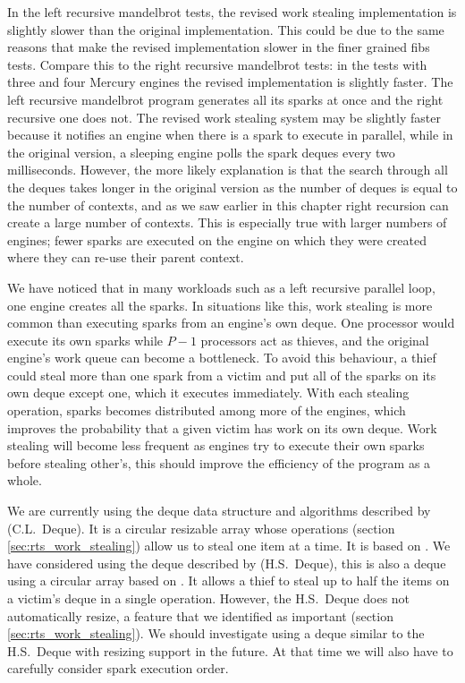 In the left recursive mandelbrot tests,
the revised work stealing implementation is slightly slower than the
original implementation.
This could be due to the same reasons that make the revised implementation
slower in the finer grained fibs tests.
Compare this to the right recursive mandelbrot tests:
in the tests with three and four Mercury engines the revised implementation
is slightly faster.
The left recursive mandelbrot program generates all its
sparks at once and the right recursive one does not.
The revised work stealing system may be slightly faster because it
notifies an engine when there is a spark to execute in parallel,
while in the original version, a sleeping engine polls the spark deques
every two milliseconds.
However, the more likely explanation is that the search through all the
deques takes longer in the original version as the number of deques is equal
to the number of contexts,
and as we saw earlier in this chapter right recursion can create a large
number of contexts.
This is especially true with larger numbers of engines;
fewer sparks are executed on the engine on which they were created where
they can re-use their parent context.

We have noticed that in many workloads such as a left recursive parallel
loop,
one engine creates all the sparks.
In situations like this,
work stealing is more common than executing sparks from an engine's own
deque.
One processor would execute its own sparks while $P - 1$ processors act as
thieves,
and the original engine's work queue can become a bottleneck.
To avoid this behaviour,
a thief could steal more than one spark from a victim and put all of
the sparks on its own deque except one, which it executes immediately.
With each stealing operation, 
sparks becomes distributed among more of the engines,
which improves the probability that a given victim has work on its own deque.
Work stealing will become less frequent as engines try to execute their own
sparks before stealing other's,
this should improve the efficiency of the program as a whole.

We are currently using the deque data structure and algorithms described by
\citet{Chase_2005_wsdeque} (C.L.\ Deque).
It is a circular resizable array whose operations
(section \ref{sec:rts_work_stealing})
allow us to steal one item at a time.
It is based on \citet{arora:1998:work-stealing}.
We have considered using the deque described by
\citet{hendler:2002:stealhalf} (H.S.\ Deque),
this is also a deque using a circular array 
based on \citet{arora:1998:work-stealing}.
It allows a thief to steal up to half the items on a victim's deque
in a single operation.
However, the H.S.\ Deque does not automatically resize,
a feature that we identified as important (section \ref{sec:rts_work_stealing}).
We should investigate using a deque similar to the H.S.\ Deque with resizing
support in the future.
At that time we will also have to carefully consider spark execution order.

